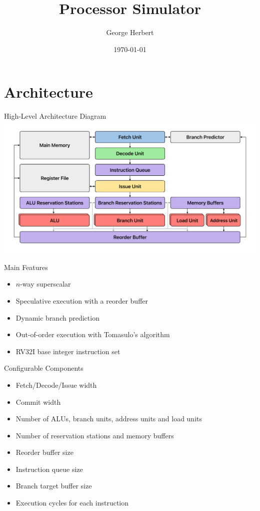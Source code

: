 \documentclass{beamer}
\title{Processor Simulator}
\author{George Herbert}
\date{\today}
\begin{document}
\begin{frame}
    \titlepage
\end{frame}

\section{Architecture}
\begin{frame}{High-Level Architecture Diagram}
    \includegraphics[width=\textwidth]{architecture.pdf}
\end{frame}

\begin{frame}{Main Features}
    \begin{itemize}
        \item $n$-way superscalar        
        \item Speculative execution with a reorder buffer
        \item Dynamic branch prediction
        \item Out-of-order execution with Tomasulo's algorithm
        \item RV32I base integer instruction set
    \end{itemize}
\end{frame}

\begin{frame}{Configurable Components}
    \begin{itemize}
        \item Fetch/Decode/Issue width
        \item Commit width
        \item Number of ALUs, branch units, address units and load units
        \item Number of reservation stations and memory buffers
        \item Reorder buffer size
        \item Instruction queue size
        \item Branch target buffer size
        \item Execution cycles for each instruction
    \end{itemize}
\end{frame}
\end{document}
